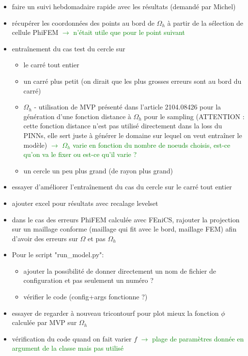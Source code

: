 \begin{itemize}[label=$\square$]
	\item[\done] faire un suivi hebdomadaire rapide avec les résultats (demandé par Michel)
	\item[\wontfix] récupérer les coordonnées des points au bord de $\Omega_h$ à partir de la sélection de cellule PhiFEM \textcolor{Green}{$\rightarrow$ n'était utile que pour le point suivant}
	\item entraînement du cas test du cercle sur 
	\begin{itemize}[label=\LARGE $\circ$]
		\item[\sdone] le carré tout entier
		\item un carré plus petit (on dirait que les plus grosses erreurs sont au bord du carré)
		\item[\swontfix] $\Omega_h$ - utilisation de MVP présenté dans l'article 2104.08426 pour la génération d'une fonction distance à $\Omega_h$ pour le sampling (ATTENTION : cette fonction distance n'est pas utilisé directement dans la loss du PINNs, elle sert juste à générer le domaine sur lequel on veut entraîner le modèle) \textcolor{Green}{$\rightarrow$ $\Omega_h$ varie en fonction du nombre de noeuds choisis, est-ce qu'on va le fixer ou est-ce qu'il varie ?}
		\item un cercle un peu plus grand (de rayon plus grand) 
	\end{itemize}
	\item essayer d'améliorer l'entraînement du cas du cercle sur le carré tout entier
	\item[\wontfix] ajouter excel pour résultats avec recalage levelset
	\item[\done] dans le cas des erreurs PhiFEM calculée avec FEniCS, rajouter la projection sur un maillage conforme (maillage qui fit avec le bord, maillage FEM) afin d'avoir des erreurs sur $\Omega$ et pas $\Omega_h$
	\item Pour le script "run\_model.py":
	\begin{itemize}[label=\LARGE $\circ$]
		\item[\swontfix] ajouter la possibilité de donner directement un nom de fichier de configuration et pas seulement un numéro ?
		\item vérifier le code (config+args fonctionne ?)
	\end{itemize}
	\item essayer de regarder à nouveau tricontourf pour plot mieux la fonction $\phi$ calculée par MVP sur $\Omega_h$
	\item[\done] vérification du code quand on fait varier $f$ \textcolor{Green}{$\rightarrow$ plage de paramètres donnée en argument de la classe mais pas utilisé}

\end{itemize}
